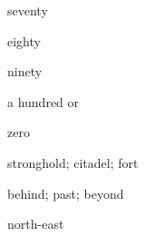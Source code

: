 \begin{flashcard}{\LARGE seventy}
\LARGE {}
\end{flashcard}
\begin{flashcard}{\LARGE eighty}
\LARGE {}
\end{flashcard}
\begin{flashcard}{\LARGE ninety}
\LARGE {}
\end{flashcard}
\begin{flashcard}{\LARGE a hundred}
\LARGE {} or 
\end{flashcard}
\begin{flashcard}{\LARGE zero}
\LARGE {}
\end{flashcard}
\begin{flashcard}{\LARGE stronghold; citadel; fort}
\LARGE {}
\end{flashcard}
\begin{flashcard}{\LARGE behind; past; beyond}
\LARGE {}
\end{flashcard}
\begin{flashcard}{\LARGE north-east}
\LARGE {}
\end{flashcard}

